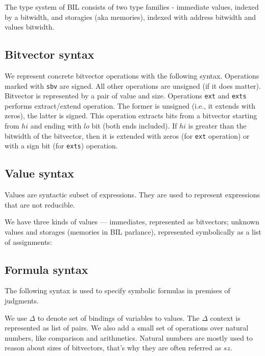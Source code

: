 \documentclass[11pt]{article}
\begin{document}
The type system of BIL consists of two type families - immediate
values, indexed by a bitwidth, and storagies (aka memories), indexed
with address bitwidth and values bitwidth.

\ottgrammartabular{
\otttype\ottinterrule
}

\subsection{Bitvector syntax}
\label{sec:bitvector}

We represent concrete bitvector operations with the following syntax.
Operations marked with \verb|sbv| are signed. All other operations are
unsigned (if it does matter). Bitvector is represented by a pair of
value and size. Operations \verb|ext| and \verb|exts| performs
extract/extend operation. The former is unsigned (i.e., it extends
with zeros), the latter is signed. This operation extracts bits from a
bitvector starting from $\mathit{hi}$ and ending with $\mathit{lo}$
bit (both ends included). If $\mathit{hi}$ is greater than the
bitwidth of the bitvector, then it is extended with zeros (for
\verb|ext| operation) or with a sign bit (for \verb|exts|) operation.

\ottgrammartabular{
\ottword\ottinterrule
}

\subsection{Value syntax}
\label{sec:values}

Values are syntactic subset of expressions. They are used to represent
expressions that are not reducible.

We have three kinds of values --- immediates, represented as
bitvectors; unknown values and storages (memories in BIL parlance),
represented symbolically as a list of assignments:

\ottgrammartabular{
\ottval\ottinterrule
}


\subsection{Formula syntax}
\label{sec:formula}

The following syntax is used to specify symbolic formulas in premises
of judgments.

We use $\Delta$ to denote set of bindings of variables to values. The
$\Delta$ context is represented as list of pairs. We also add a small
set of operations over natural numbers, like comparison and
arithmetics. Natural numbers are mostly used to reason about sizes of
bitvectors, that's why they are often referred as $\mathit{sz}$.
\end{document}
